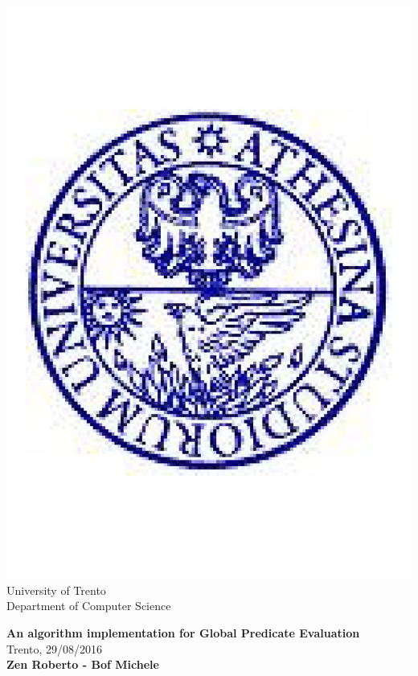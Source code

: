 \begin{titlepage}
\thispagestyle{plain}

\begin{center}
	\includegraphics[scale=0.12]{unitnlogo}	\\
	University of Trento	\\
	\small {Department of Computer Science}	\\[1cm]
\end{center}

{\centering
\textbf{\LARGE An algorithm implementation for Global Predicate Evaluation}\\[0.5cm]
\small{Trento, 29/08/2016}	\\[1cm]
\textbf{Zen Roberto - Bof Michele}

}
\vfill


\end{titlepage}
